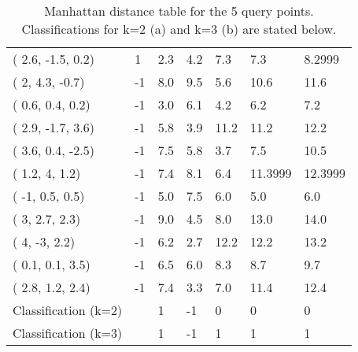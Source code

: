 \documentclass[12pt]{article}
\begin{document}
\begin{table}[h!]
\begin{tabular}{lllllll}
( 2.6, -1.5, 0.2)    & 1     & \cellcolor[HTML]{FFFE65}2.3 & 4.2                         & 7.3                         & 7.3                         & 8.2999                         \\
( 2, 4.3, -0.7)      & -1    & 8.0                         & 9.5                         & 5.6                         & 10.6                        & 11.6                           \\
( 0.6, 0.4, 0.2)     & -1    & 3.0                         & 6.1                         & 4.2                         & 6.2                         & 7.2                            \\
( 2.9, -1.7, 3.6)    & -1    & 5.8                         & \cellcolor[HTML]{FFCC67}3.9 & 11.2                        & 11.2                        & 12.2                           \\
( 3.6, 0.4, -2.5)    & -1    & 7.5                         & 5.8                         & \cellcolor[HTML]{FFFE65}3.7 & 7.5                         & 10.5                           \\
( 1.2, 4, 1.2)       & -1    & 7.4                         & 8.1                         & 6.4                         & 11.3999                     & 12.3999                        \\
( -1, 0.5, 0.5)      & -1    & 5.0                         & 7.5                         & 6.0                         & 5.0                         & 6.0                            \\
( 3, 2.7, 2.3)       & -1    & 9.0                         & 4.5                         & 8.0                         & 13.0                        & 14.0                           \\
( 4, -3, 2.2)        & -1    & 6.2                         & \cellcolor[HTML]{FFFE65}2.7 & 12.2                        & 12.2                        & 13.2                           \\
( 0.1, 0.1, 3.5)     & -1    & 6.5                         & 6.0                         & 8.3                         & 8.7                         & 9.7                            \\
( 2.8, 1.2, 2.4)     & -1    & 7.4                         & \cellcolor[HTML]{FFFE65}3.3 & 7.0                         & 11.4                        & 12.4                           \\ \hline
Classification (k=2) &       & 1                           & -1                          & 0                           & 0                           & 0                              \\
Classification (k=3) &       & 1                           & -1                          & 1                           & 1                           & 1                             \\ \hline
\end{tabular}
\caption{Manhattan distance table for the 5 query points. Classifications for k=2 (a) and k=3 (b) are stated below.}
\end{table}
\end{document}
